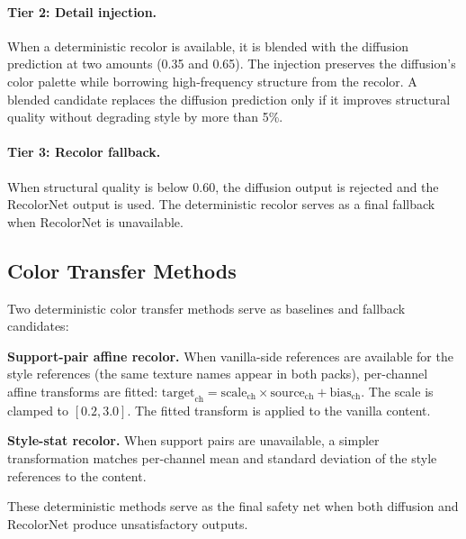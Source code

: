 \paragraph{Tier 2: Detail injection.} When a deterministic recolor is available, it is blended with the diffusion prediction at two amounts (0.35 and 0.65). The injection preserves the diffusion's color palette while borrowing high-frequency structure from the recolor. A blended candidate replaces the diffusion prediction only if it improves structural quality without degrading style by more than 5\%.

\paragraph{Tier 3: Recolor fallback.} When structural quality is below 0.60, the diffusion output is rejected and the RecolorNet output is used. The deterministic recolor serves as a final fallback when RecolorNet is unavailable.

\subsection{Color Transfer Methods}

Two deterministic color transfer methods serve as baselines and fallback candidates:

\textbf{Support-pair affine recolor.} When vanilla-side references are available for the style references (the same texture names appear in both packs), per-channel affine transforms are fitted: $\text{target}_{\text{ch}} = \text{scale}_{\text{ch}} \times \text{source}_{\text{ch}} + \text{bias}_{\text{ch}}$. The scale is clamped to $[0.2, 3.0]$. The fitted transform is applied to the vanilla content.

\textbf{Style-stat recolor.} When support pairs are unavailable, a simpler transformation matches per-channel mean and standard deviation of the style references to the content.

These deterministic methods serve as the final safety net when both diffusion and RecolorNet produce unsatisfactory outputs.
